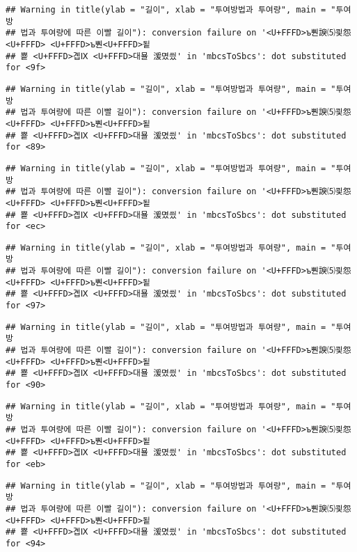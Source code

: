 \documentclass[]{article}
\begin{document}
\begin{verbatim}
## Warning in title(ylab = "길이", xlab = "투여방법과 투여량", main = "투여방
## 법과 투여량에 따른 이빨 길이"): conversion failure on '<U+FFFD>ъ뿬諛⑸쾿怨<U+FFFD> <U+FFFD>ъ뿬<U+FFFD>됱
## 뿉 <U+FFFD>곕Ⅸ <U+FFFD>대묠 湲몄씠' in 'mbcsToSbcs': dot substituted for <9f>
\end{verbatim}

\begin{verbatim}
## Warning in title(ylab = "길이", xlab = "투여방법과 투여량", main = "투여방
## 법과 투여량에 따른 이빨 길이"): conversion failure on '<U+FFFD>ъ뿬諛⑸쾿怨<U+FFFD> <U+FFFD>ъ뿬<U+FFFD>됱
## 뿉 <U+FFFD>곕Ⅸ <U+FFFD>대묠 湲몄씠' in 'mbcsToSbcs': dot substituted for <89>
\end{verbatim}

\begin{verbatim}
## Warning in title(ylab = "길이", xlab = "투여방법과 투여량", main = "투여방
## 법과 투여량에 따른 이빨 길이"): conversion failure on '<U+FFFD>ъ뿬諛⑸쾿怨<U+FFFD> <U+FFFD>ъ뿬<U+FFFD>됱
## 뿉 <U+FFFD>곕Ⅸ <U+FFFD>대묠 湲몄씠' in 'mbcsToSbcs': dot substituted for <ec>
\end{verbatim}

\begin{verbatim}
## Warning in title(ylab = "길이", xlab = "투여방법과 투여량", main = "투여방
## 법과 투여량에 따른 이빨 길이"): conversion failure on '<U+FFFD>ъ뿬諛⑸쾿怨<U+FFFD> <U+FFFD>ъ뿬<U+FFFD>됱
## 뿉 <U+FFFD>곕Ⅸ <U+FFFD>대묠 湲몄씠' in 'mbcsToSbcs': dot substituted for <97>
\end{verbatim}

\begin{verbatim}
## Warning in title(ylab = "길이", xlab = "투여방법과 투여량", main = "투여방
## 법과 투여량에 따른 이빨 길이"): conversion failure on '<U+FFFD>ъ뿬諛⑸쾿怨<U+FFFD> <U+FFFD>ъ뿬<U+FFFD>됱
## 뿉 <U+FFFD>곕Ⅸ <U+FFFD>대묠 湲몄씠' in 'mbcsToSbcs': dot substituted for <90>
\end{verbatim}

\begin{verbatim}
## Warning in title(ylab = "길이", xlab = "투여방법과 투여량", main = "투여방
## 법과 투여량에 따른 이빨 길이"): conversion failure on '<U+FFFD>ъ뿬諛⑸쾿怨<U+FFFD> <U+FFFD>ъ뿬<U+FFFD>됱
## 뿉 <U+FFFD>곕Ⅸ <U+FFFD>대묠 湲몄씠' in 'mbcsToSbcs': dot substituted for <eb>
\end{verbatim}

\begin{verbatim}
## Warning in title(ylab = "길이", xlab = "투여방법과 투여량", main = "투여방
## 법과 투여량에 따른 이빨 길이"): conversion failure on '<U+FFFD>ъ뿬諛⑸쾿怨<U+FFFD> <U+FFFD>ъ뿬<U+FFFD>됱
## 뿉 <U+FFFD>곕Ⅸ <U+FFFD>대묠 湲몄씠' in 'mbcsToSbcs': dot substituted for <94>
\end{verbatim}
\end{document}
